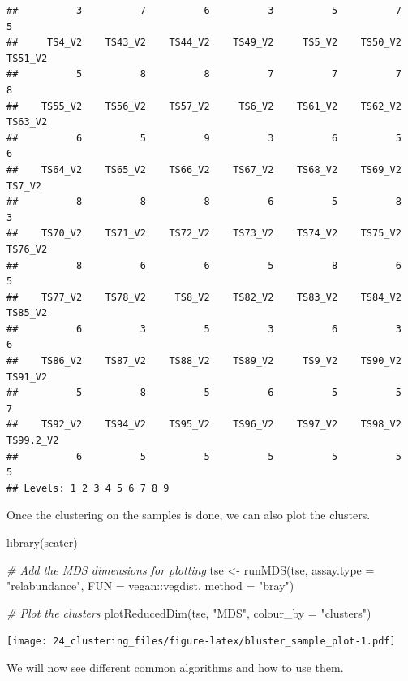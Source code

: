 \documentclass[
]{book}
\newenvironment{Shaded}{\begin{snugshade}}{\end{snugshade}}
\newcommand{\AttributeTok}[1]{\textcolor[rgb]{0.77,0.63,0.00}{#1}}
\newcommand{\CommentTok}[1]{\textcolor[rgb]{0.56,0.35,0.01}{\textit{#1}}}
\newcommand{\FunctionTok}[1]{\textcolor[rgb]{0.00,0.00,0.00}{#1}}
\newcommand{\NormalTok}[1]{#1}
\newcommand{\OtherTok}[1]{\textcolor[rgb]{0.56,0.35,0.01}{#1}}
\newcommand{\SpecialCharTok}[1]{\textcolor[rgb]{0.00,0.00,0.00}{#1}}
\newcommand{\StringTok}[1]{\textcolor[rgb]{0.31,0.60,0.02}{#1}}
\begin{document}
\begin{verbatim}
##          3          7          6          3          5          7          5 
##     TS4_V2    TS43_V2    TS44_V2    TS49_V2     TS5_V2    TS50_V2    TS51_V2 
##          5          8          8          7          7          7          8 
##    TS55_V2    TS56_V2    TS57_V2     TS6_V2    TS61_V2    TS62_V2    TS63_V2 
##          6          5          9          3          6          5          6 
##    TS64_V2    TS65_V2    TS66_V2    TS67_V2    TS68_V2    TS69_V2     TS7_V2 
##          8          8          8          6          5          8          3 
##    TS70_V2    TS71_V2    TS72_V2    TS73_V2    TS74_V2    TS75_V2    TS76_V2 
##          8          6          6          5          8          6          5 
##    TS77_V2    TS78_V2     TS8_V2    TS82_V2    TS83_V2    TS84_V2    TS85_V2 
##          6          3          5          3          6          3          6 
##    TS86_V2    TS87_V2    TS88_V2    TS89_V2     TS9_V2    TS90_V2    TS91_V2 
##          5          8          5          6          5          5          7 
##    TS92_V2    TS94_V2    TS95_V2    TS96_V2    TS97_V2    TS98_V2  TS99.2_V2 
##          6          5          5          5          5          5          5 
## Levels: 1 2 3 4 5 6 7 8 9
\end{verbatim}

Once the clustering on the samples is done, we can also plot the clusters.

\begin{Shaded}
\begin{Highlighting}[]
\FunctionTok{library}\NormalTok{(scater)}

\CommentTok{\# Add the MDS dimensions for plotting}
\NormalTok{tse }\OtherTok{\textless{}{-}} \FunctionTok{runMDS}\NormalTok{(tse, }\AttributeTok{assay.type =} \StringTok{"relabundance"}\NormalTok{, }
              \AttributeTok{FUN =}\NormalTok{ vegan}\SpecialCharTok{::}\NormalTok{vegdist, }\AttributeTok{method =} \StringTok{"bray"}\NormalTok{)}

\CommentTok{\# Plot the clusters}
\FunctionTok{plotReducedDim}\NormalTok{(tse, }\StringTok{"MDS"}\NormalTok{, }\AttributeTok{colour\_by =} \StringTok{"clusters"}\NormalTok{)}
\end{Highlighting}
\end{Shaded}

\texttt{[image: 24\_clustering\_files/figure-latex/bluster\_sample\_plot-1.pdf]}

We will now see different common algorithms and how to use them.
\end{document}

